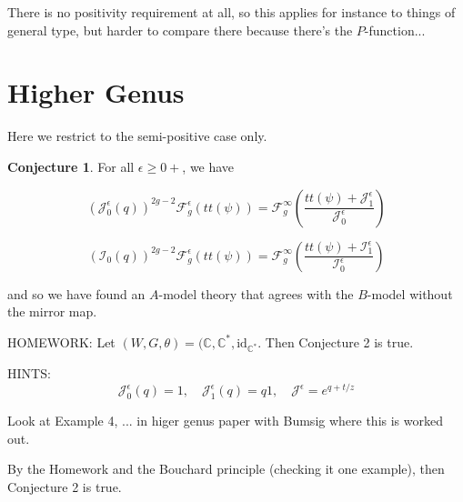 \documentclass{amsart}
\theoremstyle{definition}
\newtheorem{conjecture}[dummy]{Conjecture}
\newcommand{\I}{\mathcal{I}}
\newcommand{\J}{\mathcal{J}}
\newcommand{\C}{\mathbb{C}}
\newcommand{\one}{1}
\begin{document}
There is no positivity requirement at all, so this applies for instance to things of general type, but harder to compare there because there's the $P$-function...


\section{Higher Genus}
Here we restrict to the semi-positive case only.

\begin{conjecture}
For all $\epsilon\geq 0+$, we have

$$\left(\J_0^\epsilon(q)\right)^{2g-2}\mathcal{F}_g^\epsilon(tt(\psi))=\mathcal{F}_g^\infty \left(\frac{tt(\psi)+\J_1^\epsilon}{\J_0^\epsilon}\right)$$


\end{conjecture}
$$\left(\I_0(q)\right)^{2g-2}\mathcal{F}_g^\epsilon(tt(\psi))=\mathcal{F}_g^\infty \left(\frac{tt(\psi)+\I_1^\epsilon}{\I_0^\epsilon}\right)$$

and so we have found an $A$-model theory that agrees with the $B$-model without the mirror map.

HOMEWORK: Let $(W,G,\theta)=(\C,\C^*,\text{id}_{\C^*}$.  Then Conjecture 2 is true.  

HINTS: $$\J^\epsilon_0(q)=1,\quad \J^\epsilon_1(q)=q\one,\quad \J^\epsilon=e^{q+t/z}$$

Look at Example 4, ... in higer genus paper with Bumsig where this is worked out.

By the Homework and the Bouchard principle (checking it one example), then Conjecture 2 is true.
\end{document}
